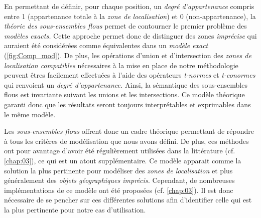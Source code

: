En permettant de définir, pour chaque position, un \emph{degré
  d'appartenance} compris entre 1 (appartenance totale à la \emph{zone
  de localisation}) et 0 (non-appartenance), la \emph{théorie des
  sous-ensembles flous} permet de contourner le premier problème des
\emph{modèles exacts.} Cette approche permet donc de distinguer des
zones \emph{imprécise} qui auraient été considérées comme équivalentes
dans un \emph{modèle exact} (\autoref{fig:Comp_mod}). De plus, les
opérations d'union et d'intersection des \emph{zones de localisation
  compatibles} nécessaires à la mise en place de notre méthodologie
peuvent êtres facilement effectuées à l'aide des opérateurs
\emph{t-normes} et \emph{t-conormes} qui renvoient un \emph{degré
  d'appartenance.} Ainsi, la sémantique des sous-ensembles flous est
invariante suivant les unions et les intersections. Ce modèle
théorique garanti donc que les résultats seront toujours
interprétables et exprimables dans le même modèle.

Les \emph{sous-ensembles flous} offrent donc un cadre théorique
permettant de répondre à tous les critères de modélisation que nous
avons défini. De plus, ces méthodes ont pour avantage d'avoir été
régulièrement utilisées dans la littérature (cf. \autoref{chap:03}),
ce qui est un atout supplémentaire. Ce modèle apparait comme la
solution la plus pertinente pour modéliser des \emph{zones de
  localisation} et plus généralement des \emph{objets géographiques
  imprécis.} Cependant, de nombreuses implémentations de ce modèle ont
été proposées (cf. \autoref{chap:03}). Il est donc nécessaire de se
pencher sur ces différentes solutions afin d'identifier celle qui est
la plus pertinente pour notre cas d'utilisation.


